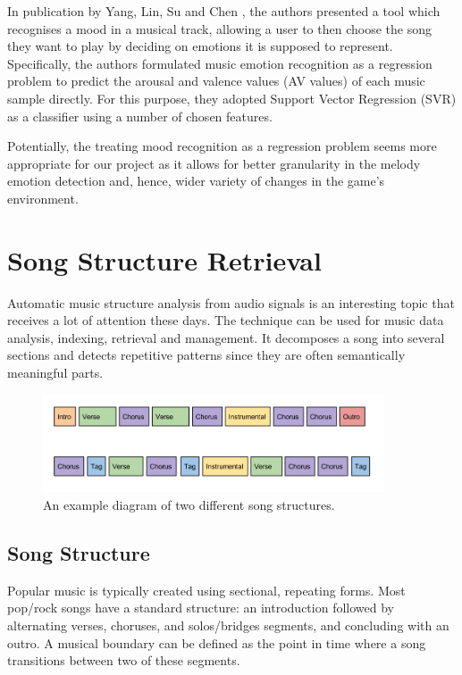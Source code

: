 In publication by Yang, Lin, Su and Chen \cite{mood}, the authors presented a tool which recognises a mood in a musical track, allowing a user to then choose the song they want to play by deciding on emotions it is supposed to represent. Specifically, the authors formulated music emotion recognition as a regression problem to predict the arousal and valence values (AV values) of each music sample directly. For this purpose, they adopted Support Vector Regression (SVR) as a classifier using a number of chosen features.

Potentially, the treating mood recognition as a regression problem seems more appropriate for our project as it allows for better granularity in the melody emotion detection and, hence, wider variety of changes in the game's environment.

\vspace{20pt}

\section{Song Structure Retrieval}

Automatic music structure analysis from audio signals is an interesting topic that receives a lot of attention these days. The technique can be used for music data analysis, indexing, retrieval and management. It decomposes a song
into several sections and detects repetitive patterns since they are often semantically meaningful parts. 

\begin{figure}[h]
	\centering
   \includegraphics[width=0.9\textwidth]{Figures/songstructure}
  \caption{An example diagram of two different song structures.}
\end{figure}


\vspace{10pt}

\subsection{Song Structure}


Popular music is typically created using sectional, repeating forms. 
Most pop/rock songs have a standard structure: an introduction followed by alternating verses, choruses, and solos/bridges segments, and concluding with an outro. A musical boundary can be defined as the point in time where a song transitions between two of these segments.

